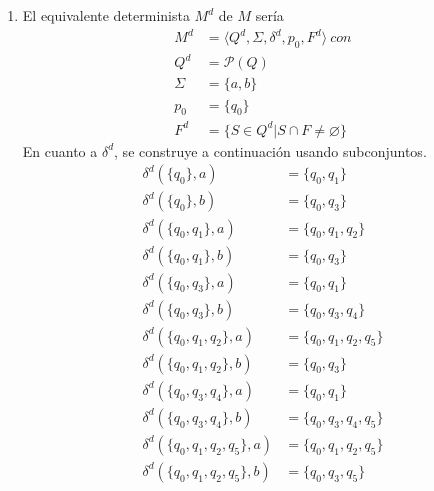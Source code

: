 \documentclass{article}
\begin{document}
\begin{enumerate}
{\begin{itemize}
\begin{enumerate}
                    \item {
                        El equivalente determinista $M^{d}$ de $M$ sería 
                        \begin{align*}
                            M^{d} &= \langle Q^{d}, \Sigma, \delta^{d}, p_{0}, 
                            F^{d} \rangle \ con\\
                            Q^{d} &= \mathcal{P}(Q) \\
                            \Sigma &= \{a, b\} \\
                            p_{0} &= \{q_{0}\} \\
                            F^{d} &= \{S \in Q^{d} | S \cap F \neq \varnothing\}
                        \end{align*}
                        En cuanto a $\delta^{d}$, se construye a continuación 
                        usando subconjuntos.
                        \begin{align*}
                            \delta^{d}(\{q_{0}\}, a) &= \{q_{0}, q_{1}\} \\
                            \delta^{d}(\{q_{0}\}, b) &= \{q_{0}, q_{3}\} \\
                            \delta^{d}(\{q_{0}, q_{1}\}, a) &= \{q_{0}, q_{1}, q_{2}\}\\
                            \delta^{d}(\{q_{0}, q_{1}\}, b) &= \{q_{0}, q_{3}\}\\
                            \delta^{d}(\{q_{0}, q_{3}\}, a) &= \{q_{0}, q_{1}\}\\
                            \delta^{d}(\{q_{0}, q_{3}\}, b) &= \{q_{0}, q_{3}, q_{4}\}\\
                            \delta^{d}(\{q_{0}, q_{1}, q_{2}\}, a) &= \{q_{0}, q_{1}, q_{2}, q_{5}\}\\
                            \delta^{d}(\{q_{0}, q_{1}, q_{2}\}, b) &= \{q_{0}, q_{3}\}\\
                            \delta^{d}(\{q_{0}, q_{3}, q_{4}\}, a) &= \{q_{0}, q_{1}\}\\
                            \delta^{d}(\{q_{0}, q_{3}, q_{4}\}, b) &= \{q_{0}, q_{3}, q_{4}, q_{5}\}\\
                            \delta^{d}(\{q_{0}, q_{1}, q_{2}, q_{5}\}, a) &= \{q_{0}, q_{1}, q_{2}, q_{5}\} \\
                            \delta^{d}(\{q_{0}, q_{1}, q_{2}, q_{5}\}, b) &= \{q_{0}, q_{3}, q_{5}\} \\

\end{align*}}
\end{enumerate}
\end{itemize}}
\end{enumerate}
\end{document}

